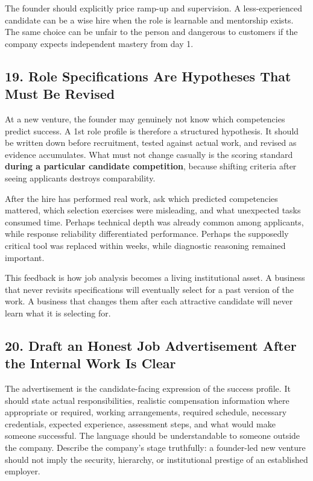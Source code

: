 The founder should explicitly price ramp-up and supervision. A less-experienced candidate can be a wise hire when the role is learnable and mentorship exists. The same choice can be unfair to the person and dangerous to customers if the company expects independent mastery from day 1.

\subsection*{19. Role Specifications Are Hypotheses That Must Be Revised}

At a new venture, the founder may genuinely not know which competencies predict success. A 1st role profile is therefore a structured hypothesis. It should be written down before recruitment, tested against actual work, and revised as evidence accumulates. What must not change casually is the scoring standard \textbf{during a particular candidate competition}, because shifting criteria after seeing applicants destroys comparability.

After the hire has performed real work, ask which predicted competencies mattered, which selection exercises were misleading, and what unexpected tasks consumed time. Perhaps technical depth was already common among applicants, while response reliability differentiated performance. Perhaps the supposedly critical tool was replaced within weeks, while diagnostic reasoning remained important.

This feedback is how job analysis becomes a living institutional asset. A business that never revisits specifications will eventually select for a past version of the work. A business that changes them after each attractive candidate will never learn what it is selecting for.

\subsection*{20. Draft an Honest Job Advertisement After the Internal Work Is Clear}

The advertisement is the candidate-facing expression of the success profile. It should state actual responsibilities, realistic compensation information where appropriate or required, working arrangements, required schedule, necessary credentials, expected experience, assessment steps, and what would make someone successful. The language should be understandable to someone outside the company. Describe the company's stage truthfully: a founder-led new venture should not imply the security, hierarchy, or institutional prestige of an established employer.

